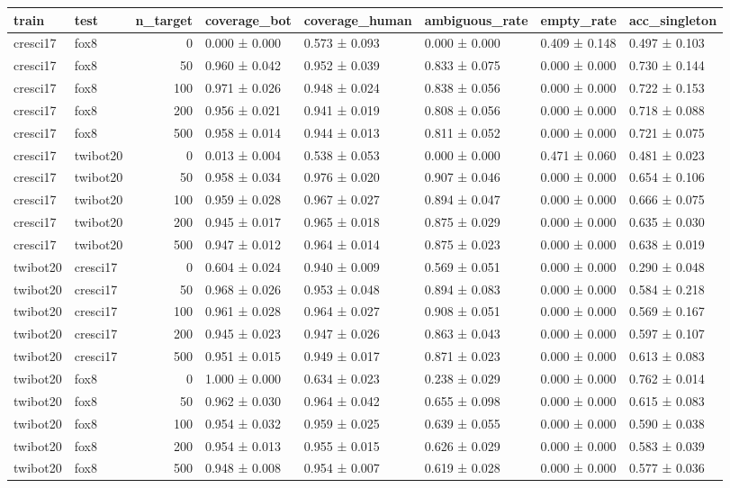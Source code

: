 \begin{tabular}{llrlllll}
\toprule
train & test & n_target & coverage_bot & coverage_human & ambiguous_rate & empty_rate & acc_singleton \\
\midrule
cresci17 & fox8 & 0 & 0.000 ± 0.000 & 0.573 ± 0.093 & 0.000 ± 0.000 & 0.409 ± 0.148 & 0.497 ± 0.103 \\
cresci17 & fox8 & 50 & 0.960 ± 0.042 & 0.952 ± 0.039 & 0.833 ± 0.075 & 0.000 ± 0.000 & 0.730 ± 0.144 \\
cresci17 & fox8 & 100 & 0.971 ± 0.026 & 0.948 ± 0.024 & 0.838 ± 0.056 & 0.000 ± 0.000 & 0.722 ± 0.153 \\
cresci17 & fox8 & 200 & 0.956 ± 0.021 & 0.941 ± 0.019 & 0.808 ± 0.056 & 0.000 ± 0.000 & 0.718 ± 0.088 \\
cresci17 & fox8 & 500 & 0.958 ± 0.014 & 0.944 ± 0.013 & 0.811 ± 0.052 & 0.000 ± 0.000 & 0.721 ± 0.075 \\
cresci17 & twibot20 & 0 & 0.013 ± 0.004 & 0.538 ± 0.053 & 0.000 ± 0.000 & 0.471 ± 0.060 & 0.481 ± 0.023 \\
cresci17 & twibot20 & 50 & 0.958 ± 0.034 & 0.976 ± 0.020 & 0.907 ± 0.046 & 0.000 ± 0.000 & 0.654 ± 0.106 \\
cresci17 & twibot20 & 100 & 0.959 ± 0.028 & 0.967 ± 0.027 & 0.894 ± 0.047 & 0.000 ± 0.000 & 0.666 ± 0.075 \\
cresci17 & twibot20 & 200 & 0.945 ± 0.017 & 0.965 ± 0.018 & 0.875 ± 0.029 & 0.000 ± 0.000 & 0.635 ± 0.030 \\
cresci17 & twibot20 & 500 & 0.947 ± 0.012 & 0.964 ± 0.014 & 0.875 ± 0.023 & 0.000 ± 0.000 & 0.638 ± 0.019 \\
twibot20 & cresci17 & 0 & 0.604 ± 0.024 & 0.940 ± 0.009 & 0.569 ± 0.051 & 0.000 ± 0.000 & 0.290 ± 0.048 \\
twibot20 & cresci17 & 50 & 0.968 ± 0.026 & 0.953 ± 0.048 & 0.894 ± 0.083 & 0.000 ± 0.000 & 0.584 ± 0.218 \\
twibot20 & cresci17 & 100 & 0.961 ± 0.028 & 0.964 ± 0.027 & 0.908 ± 0.051 & 0.000 ± 0.000 & 0.569 ± 0.167 \\
twibot20 & cresci17 & 200 & 0.945 ± 0.023 & 0.947 ± 0.026 & 0.863 ± 0.043 & 0.000 ± 0.000 & 0.597 ± 0.107 \\
twibot20 & cresci17 & 500 & 0.951 ± 0.015 & 0.949 ± 0.017 & 0.871 ± 0.023 & 0.000 ± 0.000 & 0.613 ± 0.083 \\
twibot20 & fox8 & 0 & 1.000 ± 0.000 & 0.634 ± 0.023 & 0.238 ± 0.029 & 0.000 ± 0.000 & 0.762 ± 0.014 \\
twibot20 & fox8 & 50 & 0.962 ± 0.030 & 0.964 ± 0.042 & 0.655 ± 0.098 & 0.000 ± 0.000 & 0.615 ± 0.083 \\
twibot20 & fox8 & 100 & 0.954 ± 0.032 & 0.959 ± 0.025 & 0.639 ± 0.055 & 0.000 ± 0.000 & 0.590 ± 0.038 \\
twibot20 & fox8 & 200 & 0.954 ± 0.013 & 0.955 ± 0.015 & 0.626 ± 0.029 & 0.000 ± 0.000 & 0.583 ± 0.039 \\
twibot20 & fox8 & 500 & 0.948 ± 0.008 & 0.954 ± 0.007 & 0.619 ± 0.028 & 0.000 ± 0.000 & 0.577 ± 0.036 \\
\bottomrule
\end{tabular}
